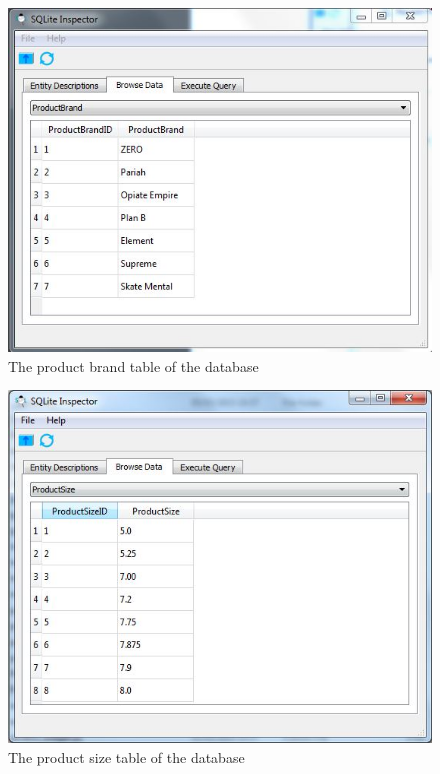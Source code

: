 \begin{figure}[H]
    \includegraphics[width=\textwidth]{./Maintenance/Figures/ProductBrandTable.jpg}
    \caption{The product brand table of the database} \label{fig:ProductBrand Table}
\end{figure}

\begin{figure}[H]
    \includegraphics[width=\textwidth]{./Maintenance/Figures/ProductSizeTable.jpg}
    \caption{The product size table of the database} \label{fig:ProductSize Table}
\end{figure}

